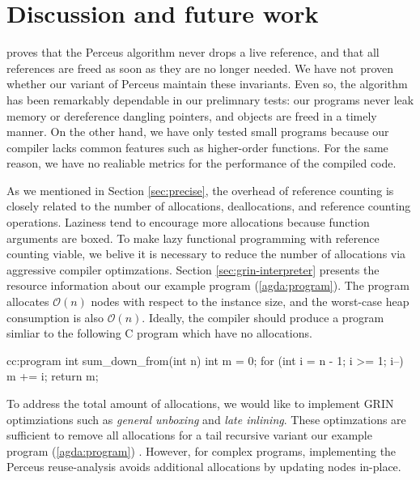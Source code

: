 \documentclass[9pt, twocolumn]{article}
\newcommand{\refp}[1]{(\ref{#1})}
\begin{document}
\section{Discussion and future work}
\label{sec:discussion-and-future-work}
\citet{reinking2021} proves that the Perceus algorithm never drops a live reference, and that all references are freed as soon as they are no longer needed.
We have not proven whether our variant of Perceus maintain these invariants.
Even so, the algorithm has been remarkably dependable in our prelimnary tests: our programs never leak memory or dereference dangling pointers, and objects are freed in a timely manner.
On the other hand, we have only tested small programs because our compiler lacks common features such as higher-order functions. 
For the same reason, we have no realiable metrics for the performance of the compiled code.

As we mentioned in Section \ref{sec:precise}, the overhead of reference counting is closely related to the number of allocations, deallocations, and reference counting operations.
Laziness tend to encourage more allocations because function arguments are boxed.
To make lazy functional programming with reference counting viable, we belive it is necessary to reduce the number of allocations via aggressive compiler optimzations.
Section \ref{sec:grin-interpreter} presents the resource information about our example program \refp{agda:program}. 
The program allocates $\mathcal{O}(n)$ nodes with respect to the instance size, and the worst-case heap consumption is also $\mathcal{O}(n)$.
Ideally, the compiler should produce a program simliar to the following C program which have no allocations.

\begin{typewriter}{c}{c:program}
int sum_down_from(int n){
  int m = 0;
  for (int i = n - 1; i >= 1; i--) 
    m += i;
  return m;
}
\end{typewriter}
To address the total amount of allocations, we would like to implement GRIN optimziations such as \emph{general unboxing} and \emph{late inlining}. 
These optimzations are sufficient to remove all allocations for a tail recursive variant our example program \refp{agda:program} \citep{boquist1999}.
However, for complex programs, implementing the Perceus reuse-analysis avoids additional allocations by updating nodes \mbox{in-place}. 
\end{document}
